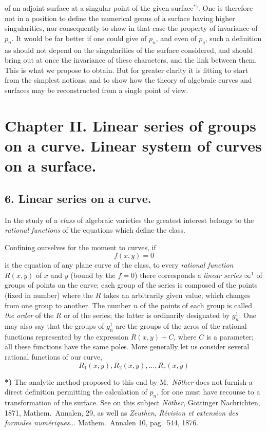 \documentclass{article}
\begin{document}
of an adjoint surface at a singular point of the given surface${}^{*)}$. One is therefore not in a position to define the numerical genus of a surface having higher singularities, nor consequently to show in that case the property of invariance of $p_{n}$. It would be far better if one could give of $p_{n}$, and even of $p_{g}$, such a definition as should not depend on the singularities of the surface considered, and should bring out at once the invariance of these characters, and the link between them. This is what we propose to obtain. But for greater clarity it is fitting to start from the simplest notions, and to show how the theory of algebraic curves and surfaces may be reconstructed from a single point of view.

\section*{Chapter II. Linear series of groups on a curve. Linear system of curves on a surface.}

\subsection*{6. Linear series on a curve.}

In the study of a \emph{class} of algebraic varieties the greatest interest belongs to the \emph{rational functions} of the equations which define the class.

Confining ourselves for the moment to curves, if
\[ f(x, y) = 0 \]
is the equation of any plane curve of the class, to every \emph{rational function} $R(x, y)$ of $x$ and $y$ (bound by the $f = 0$) there corresponds a \emph{linear series} $\infty^{1}$ of groups of points on the curve; each group of the series is composed of the points (fixed in number) where the $R$ takes an arbitrarily given value, which changes from one group to another. The number $n$ of the points of each group is called \emph{the order} of the $R$ or of the series; the latter is ordinarily designated by $g_{n}^{1}$. One may also say that the groups of $g_{n}^{1}$ are the groups of the zeros of the rational functions represented by the expression $R(x, y) + C$, where $C$ is a parameter; all these functions have the same poles. More generally let us consider several rational functions of our curve,
\[ R_{1}(x, y), R_{2}(x, y), \ldots , R_{r}(x, y) \]

\textbf{*)} The analytic method proposed to this end by M.\ \emph{Nöther} does not furnish a direct definition permitting the calculation of $p_{n}$, for one must have recourse to a transformation of the surface. See on this subject \emph{Nöther}, Göttinger Nachrichten, 1871, Mathem.\ Annalen, 29, as well as \emph{Zeuthen}, \emph{Révision et extension des formules numériques}... Mathem.\ Annalen 10, pag.\ 544, 1876.
\end{document}
